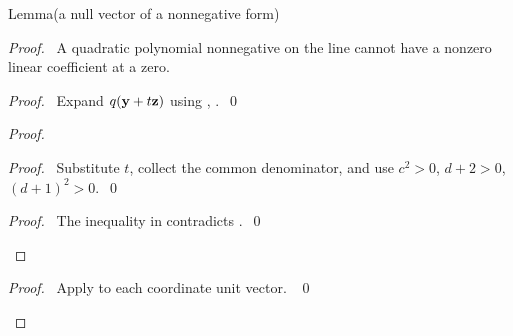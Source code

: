 \begin{namedresult}{Lemma}{(a null vector of a nonnegative form)}\label{lem:rem-null}
\end{namedresult}
\begin{proof}
\pfsketch\ A quadratic polynomial nonnegative on the line cannot have a
nonzero linear coefficient at a zero.
\begin{proof}\pf\ Expand $q({\mathbf y}+t{\mathbf z})$ using , .~\qed\end{proof}
\begin{proof}
\begin{proof}\pf\ Substitute $t$, collect the common denominator,
and use $c^2>0$, $d+2>0$, $(d+1)^2>0$.~\qed\end{proof}
\qedstep
\begin{proof}\pf\ The inequality in  contradicts
.~\qed\end{proof}
\end{proof}
\qedstep
\begin{proof}\pf\ Apply  to each coordinate unit vector. ~\qed\end{proof}
\end{proof}

